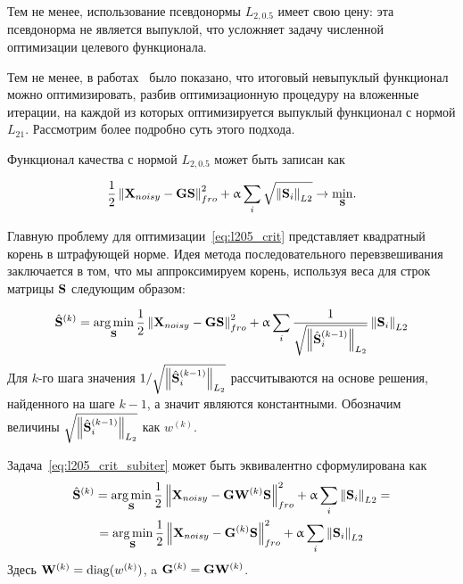 Тем не менее, использование псевдонормы $L_{2, 0.5}$ имеет свою цену: эта псевдонорма
не является выпуклой, что усложняет задачу численной оптимизации целевого функционала.

Тем не менее, в работах~\cite{Candes2008, Gasso2009, Rakotomamonjy2011} было показано, что
итоговый невыпуклый функционал можно оптимизировать, разбив оптимизационную
процедуру на вложенные итерации, на каждой из которых оптимизируется выпуклый
функционал с нормой $L_{21}$. Рассмотрим более подробно суть этого подхода.


Функционал качества с нормой $L_{2, 0.5}$ может быть записан как

\begin{equation}
    \frac{1}{2}\left\lVert\mathbf{X}_{noisy} - \mathbf{G}\mathbf{S}\right\rVert^2_{fro} + \upalpha \sum_i{\sqrt{\left\lVert\mathbf{S}_i\right\rVert_{L2}}}
    \rightarrow \underset{\mathbf{S}}{\min}.
    \label{eq:l205_crit}
\end{equation}

Главную проблему для оптимизации~\ref{eq:l205_crit} представляет квадратный
корень в штрафующей норме. Идея метода последовательного перевзвешивания
заключается в том, что мы аппроксимируем корень, используя веса для строк матрицы
$\mathbf{S}$ следующим образом:

\begin{equation}
    \hat{\mathbf{S}}^{(k)} = \operatorname*{arg\,min}_{\mathbf{S}} \frac{1}{2}\left\lVert\mathbf{X}_{noisy}
    - \mathbf{G}\mathbf{S}\right\rVert^2_{fro} + \upalpha
    \sum_i{\frac{1}{\sqrt{\left\lVert\hat{\mathbf{S}}_i^{(k-1)}\right\rVert_{L_2}}}\left\lVert\mathbf{S}_i\right\rVert_{L2}}
\label{eq:l205_crit_subiter}
\end{equation}
Для $k$-го шага значения $1/\sqrt{\left\lVert\hat{\mathbf{S}}_i^{(k-1)}\right\rVert_{L_2}}$ рассчитываются
на основе решения, найденного на шаге $k-1$, а значит являются константными. Обозначим
величины $\sqrt{\left\lVert\hat{\mathbf{S}}_i^{(k-1)}\right\rVert_{L_2}}$ как $w^{(k)}$.

Задача~\ref{eq:l205_crit_subiter} может быть эквивалентно сформулирована как
\begin{multline}
    \hat{\mathbf{S}}^{(k)} = \operatorname*{arg\,min}_{\mathbf{S}} \frac{1}{2}\left\lVert\mathbf{X}_{noisy}
    - \mathbf{G}\mathbf{W}^{(k)}\mathbf{S}\right\rVert^2_{fro} + \upalpha
    \sum_i{\left\lVert\mathbf{S}_i\right\rVert_{L2}} = \\
    = \operatorname*{arg\,min}_{\mathbf{S}} \frac{1}{2}\left\lVert\mathbf{X}_{noisy}
    - \mathbf{G}^{(k)}\mathbf{S}\right\rVert^2_{fro} + \upalpha
    \sum_i{\left\lVert\mathbf{S}_i\right\rVert_{L2}}
\label{eq:l205_crit_subiter_Wk}
\end{multline}
Здесь $\mathbf{W}^{(k)} = \operatorname{diag}(w^{(k)})$, a $\mathbf{G}^{(k)} = \mathbf{G} \mathbf{W}^{(k)}$.

